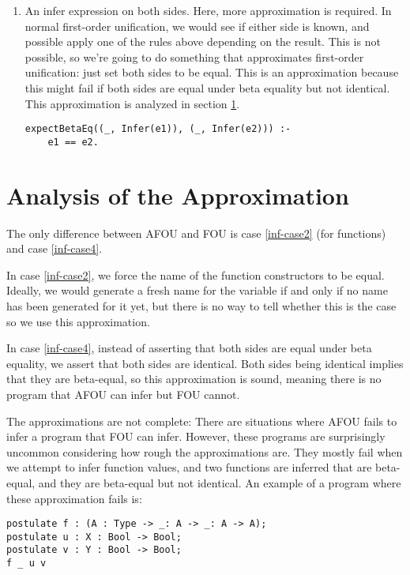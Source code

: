\begin{enumerate}
	\item \label{inf-case4} An infer expression on both sides. Here, more approximation is required. In normal first-order unification, we would see if either side is known, and possible apply one of the rules above depending on the result. This is not possible, so we're going to do something that approximates first-order unification: just set both sides to be equal. This is an approximation because this might fail if both sides are equal under beta equality but not identical. This approximation is analyzed in section \ref{analysing-inference}.
\begin{lstlisting}
expectBetaEq((_, Infer(e1)), (_, Infer(e2))) :-
	e1 == e2.
\end{lstlisting}
	
\end{enumerate}

\section{Analysis of the Approximation}
\label{analysing-inference}

The only difference between AFOU and FOU is case \ref{inf-case2} (for functions) and case \ref{inf-case4}. 

In case \ref{inf-case2}, we force the name of the function constructors to be equal. Ideally, we would generate a fresh name for the variable if and only if no name has been generated for it yet, but there is no way to tell whether this is the case so we use this approximation.

In case \ref{inf-case4}, instead of asserting that both sides are equal under beta equality, we assert that both sides are identical. Both sides being identical implies that they are beta-equal, so this approximation is sound, meaning there is no program that AFOU can infer but FOU cannot. 

The approximations are not complete: There are situations where AFOU fails to infer a program that FOU can infer. However, these programs are surprisingly uncommon considering how rough the approximations are. They mostly fail when we attempt to infer function values, and two functions are inferred that are beta-equal, and they are beta-equal but not identical. An example of a program where these approximation fails is:

\begin{lstlisting}
postulate f : (A : Type -> _: A -> _: A -> A);
postulate u : X : Bool -> Bool;
postulate v : Y : Bool -> Bool;
f _ u v
\end{lstlisting}

